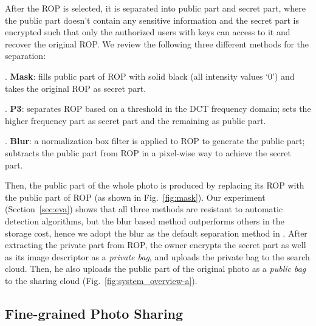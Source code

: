 After the ROP is selected, it is separated into public part and secret
part, where the public part doesn't contain any sensitive information
and the secret part is encrypted such that only the authorized
users with keys can access to it and recover the original ROP. We review
the following three different methods for the separation:

. \textbf{Mask}: fills public part of ROP with solid black (all intensity values `0') and takes the original ROP as secret part.


. \textbf{P3\cite{ra2013p3}}: separates ROP based on a threshold in the DCT frequency domain; sets the higher frequency part as secret part and the remaining as public part.

. \textbf{Blur\cite{mcdonnell1981box}}: a normalization box filter is applied to ROP to generate the public part; subtracts the public part from ROP in a pixel-wise way to achieve the secret part.


\noindent
Then, the public part of the whole photo is produced by replacing its ROP with the public part of ROP (as shown in Fig.~\ref{fig:mask}).
Our experiment (Section~\ref{sec:eva}) shows that all three methods
are resistant to automatic detection algorithms, but the blur based
method outperforms others in the storage cost, hence we adopt the blur
as the default separation method in \ourprotocolNSP. After extracting the
private part from ROP, the owner encrypts the secret part as well as
its image descriptor as a \textit{private bag}, and uploads the private
bag to the search cloud. Then, he also uploads the public part of the
original photo as a \textit{public bag} to the sharing cloud (Fig.~\ref{fig:system_overview-a}).




\vspace{-0.05in}
\subsection{Fine-grained Photo Sharing}
\vspace{-0.05in}

